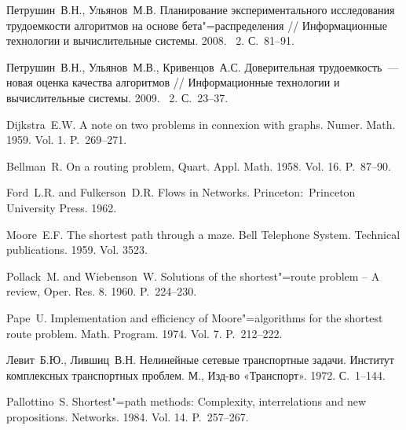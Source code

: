 \documentclass[a4paper,fontsize=14pt]{article}
\newcommand*{\No}{\textnumero}
\begin{document}
\begin{thebibliography}{10} \label{sec:sources}

	 Петрушин~В.\:Н., Ульянов~М.\:В. Планирование экспериментального исследования трудоемкости алгоритмов на основе бета"=распределения // Информационные технологии и вычислительные системы. 2008. \No~2. С.~81--91.
	
	 Петрушин~В.\:Н., Ульянов~М.\:В., Кривенцов~А.\:С. Доверительная трудоемкость~--- новая оценка качества алгоритмов // Информационные технологии и вычислительные системы. 2009. \No~2. С.~23--37.
		
	 Dijkstra~E.\:W. A note on two problems in connexion with graphs. Numer. Math. 1959. Vol. 1. P.~269--271.
	
	 Bellman~R. On a routing problem, Quart. Appl. Math. 1958. Vol. 16. P.~87--90.
	
	 Ford~L.\:R. and Fulkerson~D.\:R. Flows in Networks. Princeton:~Princeton University Press. 1962.
	
	 Moore~E.\:F. The shortest path through a maze. Bell Telephone System. Technical publications. 1959. Vol. 3523.
	
	 Pollack~M. and Wiebenson~W. Solutions of the shortest"=route problem – A review, Oper. Res. 8. 1960. P.~224--230.
	
	 Pape~U. Implementation and efficiency of Moore"=algorithms for the shortest route problem. Math. Program. 1974. Vol. 7. P.~212--222.
	
	 Левит~Б.\:Ю., Лившиц~В.\:Н. Нелинейные сетевые транспортные задачи. Институт комплексных транспортных проблем. М., Изд-во «Транспорт». 1972. С.~1--144.
	
	 Pallottino~S. Shortest"=path methods: Complexity, interrelations and new propositions. Networks. 1984. Vol. 14. P.~257--267.

\end{thebibliography}
\end{document}
